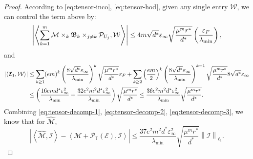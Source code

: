 \documentclass[12pt]{article}
\newcommand{\tF}{{\rm F}}
\newcommand{\abs}[1]{\left\lvert#1\right\rvert}
\newcommand{\norm}[1]{\left\lVert#1\right\rVert}
\newcommand{\cE}{\mathcal{E}}
\newcommand{\cP}{\mathcal{P}}
\newcommand{\cM}{\mathcal{M}}
\newcommand{\cI}{\mathcal{I}}
\def\calW{{\mathcal W}}
\def\TT{{\mathbb T}}
\theoremstyle{plain}
\begin{document}
\begin{proof}
According to \eqref{eq:tensor-inco}, \eqref{eq:tensor-hod}, given any single entry $\calW$, we can control the term above by:
\begin{equation}\label{eq:tensor-decomp-2}
\begin{aligned}
         \abs{\left\langle  \sum_{k=1}^{m} \cM \times_k \mathfrak{B}_k\times_{j\neq k} \cP_{{U}_j}  ,\calW \right\rangle} \le  4m \sqrt{d^*}\varepsilon_{\infty} \sqrt{\frac{\mu^m r^*}{d^*} } \left(\frac{\varepsilon_{\tF}}{\lambda_{\min}}\right),
\end{aligned}
\end{equation}
and
\begin{equation}\label{eq:tensor-decomp-3}
\begin{aligned}
         \abs{\left\langle \mathfrak{C}_1,\calW \right\rangle} & \le  \sum_{k\ge1} (em)^k \left(\frac{8  \sqrt{d^*}\varepsilon_{\infty}}{\lambda_{\min}}\right)^k\sqrt{\frac{\mu^m r^*}{d^*} } \varepsilon_{\tF}+\sum_{k\ge2}  \left(\frac{em}{2}\right)^k \left(\frac{8  \sqrt{d^*}\varepsilon_{\infty}}{\lambda_{\min}}\right)^{k-1}\sqrt{\frac{\mu^m r^*}{d^*} }8  \sqrt{d^*}\varepsilon_{\infty}
         \\
         &\le \left(\frac{16 e m d^*\varepsilon_{\infty}^2}{\lambda_{\min} }+\frac{32e^2 m^2 d^*\varepsilon_{\infty}^2}{\lambda_{\min} }\right) \sqrt{\frac{\mu^m r^*}{d^*} } \le \frac{36e^2 m^2 d^*\varepsilon_{\infty}^2}{\lambda_{\min} }\sqrt{\frac{\mu^m r^*}{d^*} }.
\end{aligned}
\end{equation}
Combining \eqref{eq:tensor-decomp-1}, \eqref{eq:tensor-decomp-2}, \eqref{eq:tensor-decomp-3}, we know that for $\widehat{\cM}$,
\begin{equation*}
    \abs{\left\langle \widehat{\cM},\cI \right\rangle-\left\langle\cM +\cP_{\TT}(\cE),\cI \right\rangle} \le \frac{37e^2 m^2 d^*\varepsilon_{\infty}^2}{\lambda_{\min} }\sqrt{\frac{\mu^m r^*}{d^*} }\norm{\cI}_{\ell_1}.
\end{equation*}
\end{proof}
\end{document}
